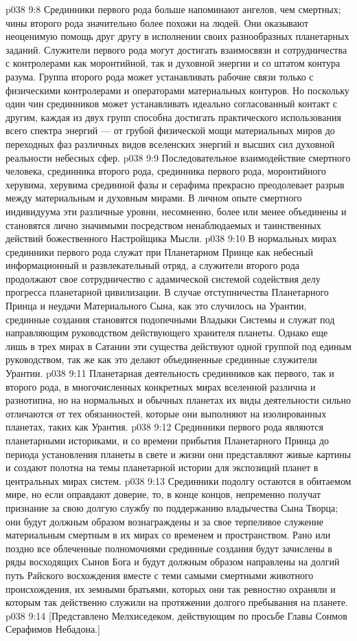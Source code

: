 \vs p038 9:8 Срединники первого рода больше напоминают ангелов, чем смертных; чины второго рода значительно более похожи на людей. Они оказывают неоценимую помощь друг другу в исполнении своих разнообразных планетарных заданий. Служители первого рода могут достигать взаимосвязи и сотрудничества с контролерами как моронтийной, так и духовной энергии и со штатом контура разума. Группа второго рода может устанавливать рабочие связи только с физическими контролерами и операторами материальных контуров. Но поскольку один чин срединников может устанавливать идеально согласованный контакт с другим, каждая из двух групп способна достигать практического использования всего спектра энергий --- от грубой физической мощи материальных миров до переходных фаз различных видов вселенских энергий и высших сил духовной реальности небесных сфер.
\vs p038 9:9 Последовательное взаимодействие смертного человека, срединника второго рода, срединника первого рода, моронтийного херувима, херувима срединной фазы и серафима прекрасно преодолевает разрыв между материальным и духовным мирами. В личном опыте смертного индивидуума эти различные уровни, несомненно, более или менее объединены и становятся лично значимыми посредством ненаблюдаемых и таинственных действий божественного Настройщика Мысли.
\vs p038 9:10 \pc В нормальных мирах срединники первого рода служат при Планетарном Принце как небесный информационный и развлекательный отряд, а служители второго рода продолжают свое сотрудничество с адамической системой содействия делу прогресса планетарной цивилизации. В случае отступничества Планетарного Принца и неудачи Материального Сына, как это случилось на Урантии, срединные создания становятся подопечными Владыки Системы и служат под направляющим руководством действующего хранителя планеты. Однако еще лишь в трех мирах в Сатании эти существа действуют одной группой под единым руководством, так же как это делают объединенные срединные служители Урантии.
\vs p038 9:11 Планетарная деятельность срединников как первого, так и второго рода, в многочисленных конкретных мирах вселенной различна и разнотипна, но на нормальных и обычных планетах их виды деятельности сильно отличаются от тех обязанностей, которые они выполняют на изолированных планетах, таких как Урантия.
\vs p038 9:12 Срединники первого рода являются планетарными историками, и со времени прибытия Планетарного Принца до периода установления планеты в свете и жизни они представляют живые картины и создают полотна на темы планетарной истории для экспозиций планет в центральных мирах систем.
\vs p038 9:13 \pc Срединники подолгу остаются в обитаемом мире, но если оправдают доверие, то, в конце концов, непременно получат признание за свою долгую службу по поддержанию владычества Сына Творца; они будут должным образом вознаграждены и за свое терпеливое служение материальным смертным в их мирах со временем и пространством. Рано или поздно все облеченные полномочиями срединные создания будут зачислены в ряды восходящих Сынов Бога и будут должным образом направлены на долгий путь Райского восхождения вместе с теми самыми смертными животного происхождения, их земными братьями, которых они так ревностно охраняли и которым так действенно служили на протяжении долгого пребывания на планете.
\vsetoff
\vs p038 9:14 [Представлено Мелхиседеком, действующим по просьбе Главы Сонмов Серафимов Небадона.]
